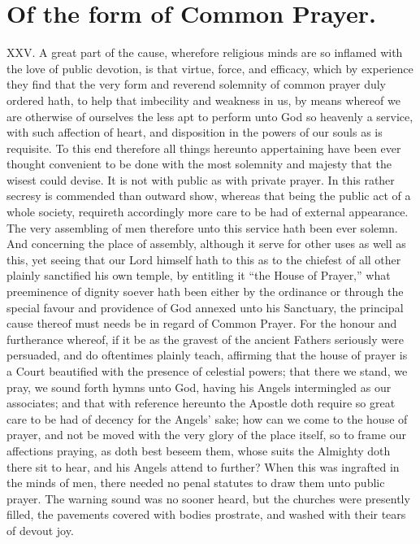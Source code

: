 \section*{Of the form of Common Prayer.}
XXV. A great part of the cause, wherefore religious minds are so inflamed with the love of public devotion, is that virtue, force, and efficacy, which by experience they find that the very form and reverend solemnity of common prayer duly ordered hath, to help that imbecility and weakness in us, by means whereof we are otherwise of ourselves the less apt to perform unto God so heavenly a service, with such affection of heart, and disposition in the powers of our souls as is requisite. To this end therefore all things hereunto appertaining have been ever thought convenient to be done with the most solemnity and majesty that the wisest could devise. It is not with public as with private prayer. In this rather secresy is commended than outward show, whereas that being the public act of a whole society, requireth accordingly more care to be had of external appearance. The very assembling of men therefore unto this service hath been ever solemn.
And concerning the place of assembly, although it serve for other uses as well as this, yet seeing that our Lord himself hath to this as to the chiefest of all other plainly sanctified his own temple, by entitling it “the House of Prayer,” what preeminence of dignity soever hath been either by the ordinance or through the special favour and providence of God annexed unto his Sanctuary, the principal cause thereof must needs be in regard of Common Prayer. For the honour and furtherance whereof, if it be as the gravest of the ancient Fathers seriously were persuaded, and do oftentimes plainly teach, affirming that the house of prayer is a Court beautified with the presence of celestial powers; that there we stand, we pray, we sound forth hymns unto God, having his Angels intermingled as our associates; and that with reference hereunto the Apostle doth require so great care to be had of decency for the Angels’ sake; how can we come to the house of prayer, and not be moved with the very glory of the place itself, so to frame our affections praying, as doth best beseem them, whose suits the Almighty doth there sit to hear, and his Angels attend to further? When this was ingrafted in the minds of men, there needed no penal statutes to draw them unto public prayer. The warning sound was no sooner heard, but the churches were presently filled, the pavements covered with bodies prostrate, and washed with their tears of devout joy.

